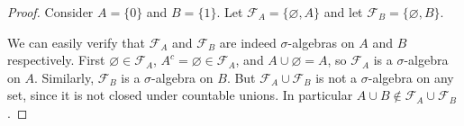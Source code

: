 \begin{proof}
  
Consider $ A = \{0\} $ and $ B = \{1\} $.
Let $ \mathcal{F}_A = \{\varnothing, A\} $
and let $ \mathcal{F}_B = \{\varnothing, B\} $.

We can easily verify that $ \mathcal{F}_A $ and  $ \mathcal{F}_B $
are indeed  $ \sigma $-algebras on $ A $ and $ B $ respectively.
First $ \varnothing \in \mathcal{F}_A $,
$ A^c = \varnothing \in \mathcal{F}_A $,
and  $ A \cup \varnothing = A $,
so $ \mathcal{F}_A $ is a $ \sigma $-algebra on $ A $.
Similarly, $ \mathcal{F}_B $ is a $ \sigma $-algebra on $ B $.
But $ \mathcal{F}_A \cup \mathcal{F}_B $
is not a $ \sigma $-algebra on any set,
since it is not closed under countable unions.
In particular  $ A \cup B \notin \mathcal{F}_A \cup \mathcal{F}_B $.

\end{proof}
